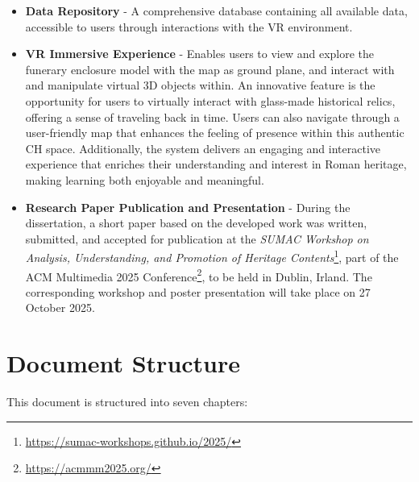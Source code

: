 \begin{itemize}
   \item  \textbf{Data Repository} - A comprehensive database containing all available data, accessible to users through interactions with the \gls{VR} environment.
   \item \textbf{\gls{VR} Immersive Experience} - Enables users to view and explore the funerary enclosure model with the map as ground plane, and interact with and manipulate virtual \gls{3D} objects within.  An innovative feature is the opportunity for users to virtually interact with glass-made historical relics, offering a sense of traveling back in time. Users can also navigate through a user-friendly map that enhances the feeling of presence within this authentic \gls{CH} space. 
   Additionally, the system delivers an engaging and interactive experience that enriches their understanding and interest in Roman heritage, making learning both enjoyable and meaningful.
   \item \textbf{Research Paper Publication and Presentation} - During the dissertation, a short paper based on the developed work was written, submitted, and accepted for publication at the \textit{SUMAC Workshop on Analysis, Understanding, and Promotion of Heritage Contents}\footnote{\url{https://sumac-workshops.github.io/2025/}}, part of the ACM Multimedia 2025 Conference\footnote{\url{https://acmmm2025.org/}}, to be held in Dublin, Irland. The corresponding workshop and poster presentation will take place on 27 October 2025.
\end{itemize}


\section{Document Structure}
\label{sec:document_structure}

This document is structured into seven chapters:

